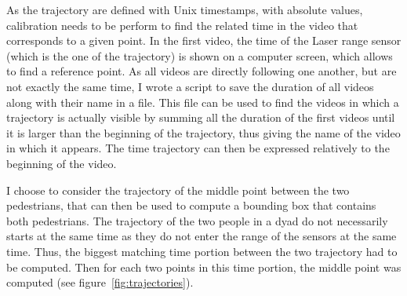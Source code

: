 \documentclass[12pt,a4paper,twoside]{article}
\begin{document}
As the trajectory are defined with Unix timestamps, with absolute values, calibration needs to be perform to find the related time in the video that corresponds to a given point. In the first video, the time of the Laser range sensor (which is the one of the trajectory) is shown on a computer screen, which allows to find a reference point. As all videos are directly following one another, but are not exactly the same time, I wrote a script to save the duration of all videos along with their name in a file. This file can be used to find the videos in which a trajectory is actually visible by summing all the duration of the first videos until it is larger than the beginning of the trajectory, thus giving the name of the video in which it appears. The time trajectory can then be expressed relatively to the beginning of the video. 

I choose to consider the trajectory of the middle point between the two pedestrians, that can then be used to compute a bounding box that contains both pedestrians. The trajectory of the two people in a dyad do not necessarily starts at the same time as they do not enter the range of the sensors at the same time. Thus, the biggest matching time portion between the two trajectory had to be computed. Then for each two points in this time portion, the middle point was computed (see figure~\ref{fig:trajectories}).
\end{document}
